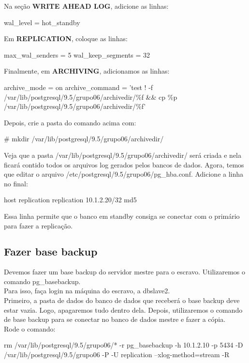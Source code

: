 \documentclass[a4paper,10pt]{article}
\begin{document}
      Na seção \textbf{WRITE AHEAD LOG}, adicione as linhas:
      \begin{spverbatim}
      wal_level = hot_standby
      \end{spverbatim}

      Em \textbf{REPLICATION}, coloque as linhas:
      \begin{spverbatim}
      max_wal_senders = 5
      wal_keep_segments = 32
      \end{spverbatim}

      Finalmente, em \textbf{ARCHIVING}, adicionamos as linhas:
      \begin{spverbatim}
      archive_mode = on
      archive_command = 'test ! -f /var/lib/postgresql/9.5/grupo06/archivedir/\%f && cp \%p /var/lib/postgresql/9.5/grupo06/archivedir/\%f'
      \end{spverbatim}

     Depois, crie a pasta do comando acima com:
      \begin{spverbatim}
      # mkdir /var/lib/postgresql/9.5/grupo06/archivedir/
      \end{spverbatim}

      Veja que a pasta /var/lib/postgresql/9.5/grupo06/archivedir/ será criada e nela ficará contido todos os arquivos log gerados pelos bancos de dados.
      Agora, temos que editar o arquivo /etc/postgresql/9.5/grupo06/pg\_hba.conf. Adicione a linha no final:
      \begin{spverbatim}
      host    replication     replication     10.1.2.20/32    md5
      \end{spverbatim}

      Essa linha permite que o banco em standby consiga se conectar com o primário para fazer a replicação.
    \subsection{Fazer base backup}
        Devemos fazer um base backup do servidor mestre para o escravo. Utilizaremos o comando pg\_basebackup.\\
        Para isso, faça login na máquina do escravo, a dbslave2.\\
        Primeiro, a pasta de dados do banco de dados que receberá o base backup deve estar vazia. Logo, apagaremos tudo dentro dela. Depois, utilizaremos o comando de base backup para se conectar no banco de dados mestre e fazer a cópia.\\
        Rode o comando:
        \begin{spverbatim}
        rm /var/lib/postgresql/9.5/grupo06/* -r
        pg_basebackup -h 10.1.2.10 -p 5434 -D /var/lib/postgresql/9.5/grupo06 -P -U replication --xlog-method=stream -R
        \end{spverbatim}
\end{document}
